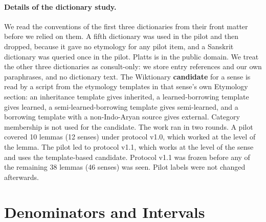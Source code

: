\documentclass[11pt]{article}
\begin{document}
\paragraph{Details of the dictionary study.} We read the conventions of the first three dictionaries from their front matter before we relied on them. A fifth dictionary was used in the pilot and then dropped, because it gave no etymology for any pilot item, and a Sanskrit dictionary was queried once in the pilot. Platts is in the public domain. We treat the other three dictionaries as consult-only: we store entry references and our own paraphrases, and no dictionary text. The Wiktionary \textbf{candidate} for a sense is read by a script from the etymology templates in that sense's own Etymology section: an inheritance template gives inherited, a learned-borrowing template gives learned, a semi-learned-borrowing template gives semi-learned, and a borrowing template with a non-Indo-Aryan source gives external. Category membership is not used for the candidate. The work ran in two rounds. A pilot covered 10 lemmas (12 senses) under protocol v1.0, which worked at the level of the lemma. The pilot led to protocol v1.1, which works at the level of the sense and uses the template-based candidate. Protocol v1.1 was frozen before any of the remaining 38 lemmas (46 senses) was seen. Pilot labels were not changed afterwards.

\section{Denominators and Intervals}
\label{app:denominators}
\end{document}
